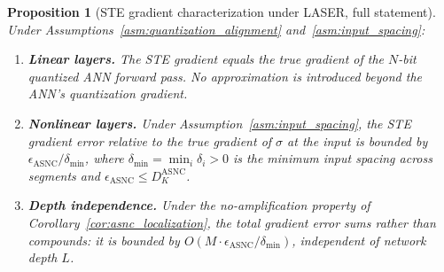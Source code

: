 \documentclass{article}
\theoremstyle{plain}
\newtheorem{proposition}[theorem]{Proposition}
\theoremstyle{definition}
\theoremstyle{remark}
\begin{document}
\begin{proposition}[STE gradient characterization under LASER, full statement]
\label{prop:ste_correct}
Under Assumptions~\ref{asm:quantization_alignment} and~\ref{asm:input_spacing}:
\begin{enumerate}[label=(\roman*),leftmargin=*]
  \item \textbf{Linear layers.} The STE gradient equals the true gradient of the
        $N$-bit quantized ANN forward pass. No approximation is introduced beyond the
        ANN's quantization gradient.
  \item \textbf{Nonlinear layers.} Under Assumption~\ref{asm:input_spacing}, the STE
        gradient error relative to the true gradient of $\sigma$ at the input is
        bounded by $\epsilon_{\mathrm{ASNC}} / \delta_{\min}$, where
        $\delta_{\min} = \min_i \delta_i > 0$ is the minimum input spacing across
        segments and $\epsilon_{\mathrm{ASNC}} \le D_K^{\mathrm{ASNC}}$.
  \item \textbf{Depth independence.} Under the no-amplification property of
        Corollary~\ref{cor:asnc_localization}, the total gradient error sums rather
        than compounds: it is bounded by $O(M \cdot \epsilon_{\mathrm{ASNC}} /
        \delta_{\min})$, independent of network depth $L$.
\end{enumerate}
\end{proposition}
\end{document}
